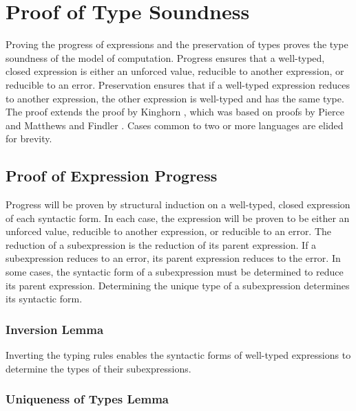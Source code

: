 \chapter{Proof of Type Soundness}


Proving the progress of expressions and the preservation of types proves the type soundness of the model of computation.  Progress ensures that a well-typed, closed expression is either an unforced value, reducible to another expression, or reducible to an error.  Preservation ensures that if a well-typed expression reduces to another expression, the other expression is well-typed and has the same type.  The proof extends the proof by Kinghorn \cite{kinghorn07}, which was based on proofs by Pierce \cite{pierce02} and Matthews and Findler \cite{matthews07}.  Cases common to two or more languages are elided for brevity.

\section{Proof of Expression Progress}

Progress will be proven by structural induction on a well-typed, closed expression of each syntactic form.  In each case, the expression will be proven to be either an unforced value, reducible to another expression, or reducible to an error.  The reduction of a subexpression is the reduction of its parent expression.  If a subexpression reduces to an error, its parent expression reduces to the error.  In some cases, the syntactic form of a subexpression must be determined to reduce its parent expression.  Determining the unique type of a subexpression determines its syntactic form.

\subsection{Inversion Lemma}

Inverting the typing rules enables the syntactic forms of well-typed expressions to determine the types of their subexpressions.



\subsection{Uniqueness of Types Lemma}

